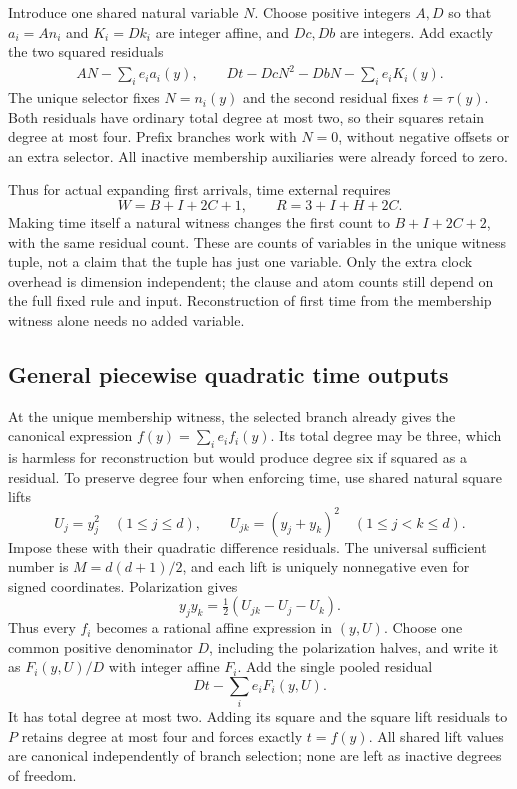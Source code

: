\documentclass[11pt,letterpaper]{article}
\numberwithin{equation}{section}
\theoremstyle{definition}
\theoremstyle{remark}
\begin{document}
Introduce one shared natural variable $N$. Choose positive integers $A,D$ so that $a_i=An_i$ and $K_i=Dk_i$ are integer affine, and $Dc,Db$ are integers. Add exactly the two squared residuals
\begin{align}\label{smc:og:eq:sharedcycle}
 AN-\sum_i e_i a_i(y),\qquad
 Dt-DcN^2-DbN-\sum_i e_iK_i(y).
\end{align}
The unique selector fixes $N=n_i(y)$ and the second residual fixes $t=\tau(y)$. Both residuals have ordinary total degree at most two, so their squares retain degree at most four. Prefix branches work with $N=0$, without negative offsets or an extra selector. All inactive membership auxiliaries were already forced to zero.

Thus for actual expanding first arrivals, time external requires
\begin{equation}\label{smc:og:eq:sharedcounts}
 W=B+I+2C+1,\qquad R=3+I+H+2C.
\end{equation}
Making time itself a natural witness changes the first count to $B+I+2C+2$, with the same residual count. These are counts of variables in the unique witness tuple, not a claim that the tuple has just one variable. Only the extra clock overhead is dimension independent; the clause and atom counts still depend on the full fixed rule and input. Reconstruction of first time from the membership witness alone needs no added variable.

\subsection{General piecewise quadratic time outputs}
At the unique membership witness, the selected branch already gives the canonical expression $f(y)=\sum_i e_i f_i(y)$. Its total degree may be three, which is harmless for reconstruction but would produce degree six if squared as a residual. To preserve degree four when enforcing time, use shared natural square lifts
\[
 U_j=y_j^2\quad(1\le j\le d),\qquad
 U_{jk}=(y_j+y_k)^2\quad(1\le j<k\le d).
\]
Impose these with their quadratic difference residuals. The universal sufficient number is $M=d(d+1)/2$, and each lift is uniquely nonnegative even for signed coordinates. Polarization gives
\[
 y_jy_k=\tfrac12(U_{jk}-U_j-U_k).
\]
Thus every $f_i$ becomes a rational affine expression in $(y,U)$. Choose one common positive denominator $D$, including the polarization halves, and write it as $F_i(y,U)/D$ with integer affine $F_i$. Add the single pooled residual
\begin{equation}\label{smc:og:eq:time-residual}
 Dt-\sum_i e_iF_i(y,U).
\end{equation}
It has total degree at most two. Adding its square and the square lift residuals to $P$ retains degree at most four and forces exactly $t=f(y)$. All shared lift values are canonical independently of branch selection; none are left as inactive degrees of freedom.
\end{document}
